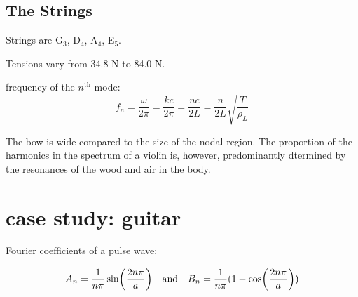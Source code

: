 \documentclass[10pt, a4paper, twocolumn]{article}
\begin{document}
\subsection{The Strings}
Strings are G$_3$, D$_4$, A$_4$, E$_5$.

Tensions vary from 34.8 N to 84.0 N.

frequency of the $n^\text{th}$ mode:
\[f_n=\frac{\omega}{2\pi}
=\frac{kc}{2\pi}
=\frac{nc}{2L}
=\frac{n}{2L}\sqrt{\frac{T}{\rho _L}}\]

The bow is wide compared to the size of the nodal region. The proportion of the harmonics in the spectrum of a violin is, however, predominantly dtermined by the resonances of the wood and air in the body.

\section{case study: guitar}

Fourier coefficients of a pulse wave:

\[A_n=\frac{1}{n\pi} \sin(\frac{2n\pi}{a})
\qq{and} B_n=\frac{1}{n\pi}(1-\cos(\frac{2n\pi}{a}))\]
\end{document}
